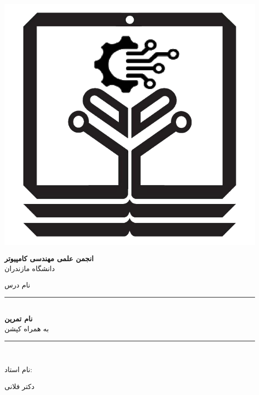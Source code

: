 \begin{titlepage}

\newcommand{\HRule}{\rule{\linewidth}{0.5mm}}
\center



\begin{minipage}{0.4\textwidth}
\begin{flushleft}
\includegraphics[scale=.15]{figure/logo.png}
\end{flushleft}
\end{minipage}
\hspace{1cm}
\begin{minipage}{0.5\textwidth}
\begin{flushright}
\textbf{\huge انجمن علمی مهندسی کامپیوتر}\\
\huge دانشگاه مازندران
\end{flushright}
\end{minipage}

\vspace*{4\baselineskip} 

\Large نام درس

\HRule \\[0.4cm]
\textbf{\Huge نام تمرین}\\
به همراه کپشن
\HRule \\[1.5cm]


\begin{minipage}{0.4\textwidth}
\begin{flushright} \Large
نام استاد:
\end{flushright}
\begin{center} \Large
دکتر فلانی
\end{center}
\end{minipage}


\end{titlepage}

